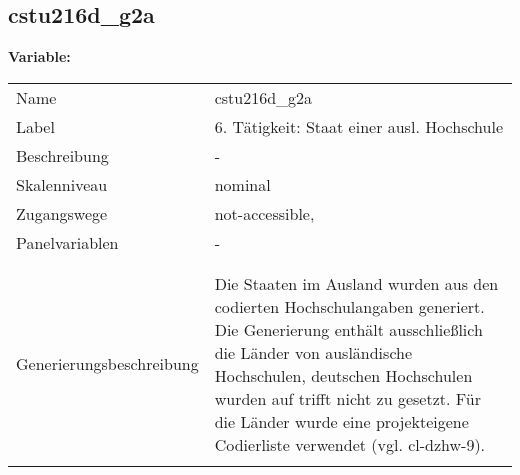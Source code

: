 	
	
	\subsection{cstu216d\_g2a}
	\label{subSection:cstu216d_g2a}

	\noindent\textbf{Variable:}\\
		\begin{tabular}{lL{11.3cm}}
			\label{tableVariable:cstu216d_g2a}
			Name & cstu216d\_g2a \\
			Label & 6. Tätigkeit: Staat einer ausl. Hochschule \\
			Beschreibung & - \\
			Skalenniveau & nominal \\
			Zugangswege &
				not-accessible,
 \\
			Panelvariablen & -
			 \\
			 \\
 \\
					Generierungsbeschreibung & Die Staaten im Ausland wurden aus den codierten Hochschulangaben generiert. Die Generierung enthält ausschließlich die Länder von ausländische Hochschulen, deutschen Hochschulen wurden auf trifft nicht zu gesetzt. Für die Länder wurde eine projekteigene Codierliste verwendet (vgl. cl-dzhw-9).
				 \\	
			 \\
		\end{tabular}






	
	\newpage
